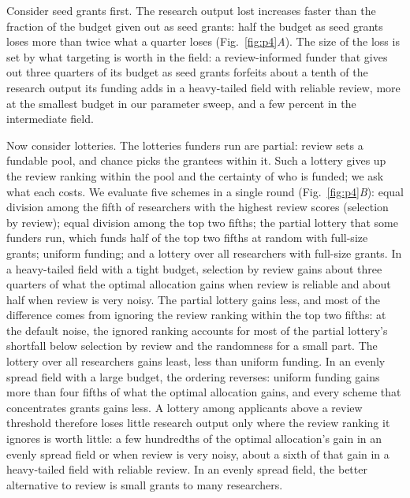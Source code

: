 \documentclass[article, 11pt, reqno]{amsart}
\theoremstyle{named}
\begin{document}
Consider seed grants first. The research output lost increases faster than the fraction of the budget given out as seed grants: half the budget as seed grants loses more than twice what a quarter loses (Fig.~\ref{fig:p4}\textit{A}). The size of the loss is set by what targeting is worth in the field: a review-informed funder that gives out three quarters of its budget as seed grants forfeits about a tenth of the research output its funding adds in a heavy-tailed field with reliable review, more at the smallest budget in our parameter sweep, and a few percent in the intermediate field.

Now consider lotteries. The lotteries funders run are partial: review sets a fundable pool, and chance picks the grantees within it. Such a lottery gives up the review ranking within the pool and the certainty of who is funded; we ask what each costs. We evaluate five schemes in a single round (Fig.~\ref{fig:p4}\textit{B}): equal division among the fifth of researchers with the highest review scores (selection by review); equal division among the top two fifths; the partial lottery that some funders run, which funds half of the top two fifths at random with full-size grants; uniform funding; and a lottery over all researchers with full-size grants. In a heavy-tailed field with a tight budget, selection by review gains about three quarters of what the optimal allocation gains when review is reliable and about half when review is very noisy. The partial lottery gains less, and most of the difference comes from ignoring the review ranking within the top two fifths: at the default noise, the ignored ranking accounts for most of the partial lottery's shortfall below selection by review and the randomness for a small part. The lottery over all researchers gains least, less than uniform funding. In an evenly spread field with a large budget, the ordering reverses: uniform funding gains more than four fifths of what the optimal allocation gains, and every scheme that concentrates grants gains less. A lottery among applicants above a review threshold therefore loses little research output only where the review ranking it ignores is worth little: a few hundredths of the optimal allocation's gain in an evenly spread field or when review is very noisy, about a sixth of that gain in a heavy-tailed field with reliable review. In an evenly spread field, the better alternative to review is small grants to many researchers.
\end{document}
